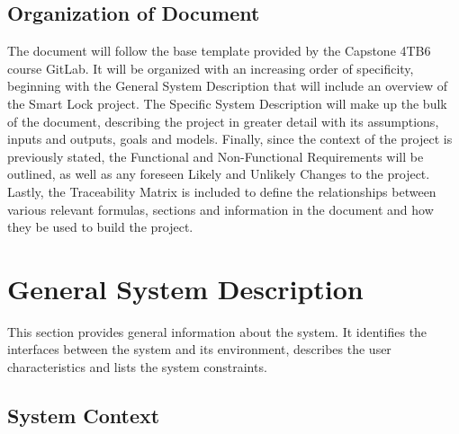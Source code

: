\documentclass[12pt]{article}
\begin{document}
\subsection{Organization of Document}

The document will follow the base template provided by the Capstone 4TB6 course GitLab. It will be organized with an increasing order of specificity, beginning with the General System Description that will include an overview of the Smart Lock project. The Specific System Description will make up the bulk of the document, describing the project in greater detail with its assumptions, inputs and outputs, goals and models. Finally, since the context of the project is previously stated, the Functional and Non-Functional Requirements will be outlined, as well as any foreseen Likely and Unlikely Changes to the project. Lastly, the Traceability Matrix is included to define the relationships between various relevant formulas, sections and information in the document and how they be used to build the project.  

\section{General System Description}

This section provides general information about the system.  It identifies the
interfaces between the system and its environment, describes the user
characteristics and lists the system constraints.  


\subsection{System Context}
\end{document}
